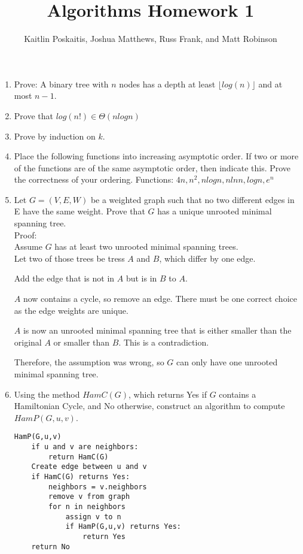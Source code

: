 \documentclass[12pt]{article}
\title{\bf Algorithms Homework 1}
\author{Kaitlin Poskaitis, Joshua Matthews, Russ Frank, and Matt Robinson}
\date{}
\begin{document}
\maketitle

\begin{enumerate}
\item Prove: A binary tree with $n$ nodes has a depth at least $\lfloor
log(n) \rfloor$ and at most $n - 1$.

\item Prove that $log(n!) \in \Theta(nlogn)$

\item Prove by induction on $k$.


\item Place the following functions into increasing asymptotic order. If two
or more of the functions are of the same asymptotic order, then indicate this.
Prove the correctness of your ordering.
Functions: $4n, n^2, nlogn, nlnn, logn, e^n$

\item Let $G = (V,E,W)$ be a weighted graph such that no two different edges
in E have the same weight. Prove that $G$ has a unique unrooted minimal spanning
tree.\\
Proof:\\
Assume $G$ has at least two unrooted minimal spanning trees.\\
Let two of those trees be tress $A$ and $B$, which differ by one
edge.

Add the edge that is not in $A$ but is in $B$ to $A$.

$A$ now contains a cycle, so remove an edge. There must be one
correct choice as the edge weights are unique.

$A$ is now an unrooted minimal spanning tree that is either
smaller than the original $A$ or smaller than $B$. This is a contradiction.

Therefore, the assumption was wrong, so $G$ can only have one
unrooted minimal spanning tree.


\item Using the method $HamC(G)$, which returns Yes if $G$ contains a
Hamiltonian Cycle, and No otherwise, construct an algorithm to compute
$HamP(G,u,v)$.

\begin{lstlisting}
HamP(G,u,v)
    if u and v are neighbors:
        return HamC(G)
    Create edge between u and v
    if HamC(G) returns Yes:
        neighbors = v.neighbors
        remove v from graph
        for n in neighbors
            assign v to n
            if HamP(G,u,v) returns Yes:
                return Yes
    return No

\end{lstlisting}

\end{enumerate}
\end{document}
